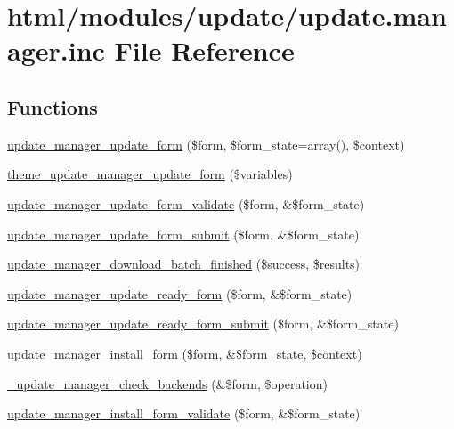 \hypertarget{update_8manager_8inc}{
\section{html/modules/update/update.manager.inc File Reference}
\label{update_8manager_8inc}
}
\subsection*{Functions}
\begin{DoxyCompactItemize}
\item 
\hyperlink{group__forms_ga0fa2e185b0bcbac10f995d964a199c65}{update\_\-manager\_\-update\_\-form} (\$form, \$form\_\-state=array(), \$context)
\item 
\hyperlink{group__themeable_gabb2fc045b955c164831ddb609f8720c7}{theme\_\-update\_\-manager\_\-update\_\-form} (\$variables)
\item 
\hyperlink{group__update__manager__update_ga578871dbee92e6bcb2f48ba232554c27}{update\_\-manager\_\-update\_\-form\_\-validate} (\$form, \&\$form\_\-state)
\item 
\hyperlink{group__update__manager__update_gaec3a60b324711da2e658cf10d9b85447}{update\_\-manager\_\-update\_\-form\_\-submit} (\$form, \&\$form\_\-state)
\item 
\hyperlink{group__update__manager__update_ga50343ba82d02305076486ec30c543f1f}{update\_\-manager\_\-download\_\-batch\_\-finished} (\$success, \$results)
\item 
\hyperlink{group__forms_gab1105c1314e1bd8822eef3cb16f78b26}{update\_\-manager\_\-update\_\-ready\_\-form} (\$form, \&\$form\_\-state)
\item 
\hyperlink{group__update__manager__update_gaeab4690bf95cb0d0b517a0b9161e5045}{update\_\-manager\_\-update\_\-ready\_\-form\_\-submit} (\$form, \&\$form\_\-state)
\item 
\hyperlink{group__forms_ga5905518e0d54228827271f90dcd8c5c3}{update\_\-manager\_\-install\_\-form} (\$form, \&\$form\_\-state, \$context)
\item 
\hyperlink{group__update__manager__install_gad9962bc5fd3a9c0eb86cb469d247d7dc}{\_\-update\_\-manager\_\-check\_\-backends} (\&\$form, \$operation)
\item 
\hyperlink{group__update__manager__install_ga56ab9860e1bc481b261a24c6ef480f75}{update\_\-manager\_\-install\_\-form\_\-validate} (\$form, \&\$form\_\-state)
\item 

\end{DoxyCompactItemize}
